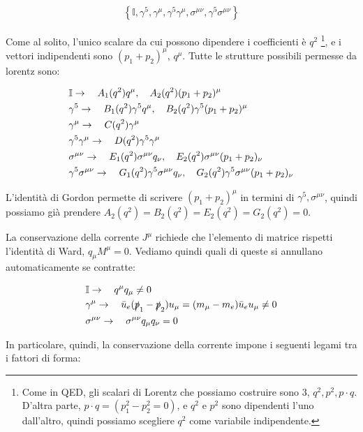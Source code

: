 \documentclass[11pt]{report}
\begin{document}
\begin{align}
    \left\{\mathbb{I}, \gamma^5, \gamma^\mu, \gamma^5\gamma^\mu, \sigma^{\mu\nu}, \gamma^5\sigma^{\mu\nu} \right\}
\end{align}

Come al solito, l'unico scalare da cui possono dipendere i coefficienti è \(q^2\) \footnote{Come in QED, gli scalari di Lorentz che possiamo costruire sono 3, \(q^2, p^2, p\cdot q\). D'altra parte, \(p\cdot q = (p_1^2 - p_2^2 = 0)\), e \(q^2\) e \(p^2\) sono dipendenti l'uno dall'altro, quindi possiamo scegliere \(q^2\) come variabile indipendente.}, e i vettori indipendenti sono \((p_1+p_2)^\mu, \, q^\mu\). Tutte le strutture possibili permesse da lorentz sono: 

\begin{align}
    &\mathbb{I} \to \quad A_1(q^2)q^\mu, \quad A_2(q^2)(p_1+p_2)^\mu \notag \\
    &\gamma^5 \to \quad B_1(q^2)\gamma^5 q^\mu, \quad B_2(q^2)\gamma^5 (p_1+p_2)^\mu \notag \\
    &\gamma^\mu  \to \quad C(q^2)\gamma^\mu \notag \\
    &\gamma^5\gamma^\mu \to \quad D(q^2) \gamma^5\gamma^\mu \notag \\ 
    &\sigma^{\mu\nu} \to \quad E_1(q^2)\sigma^{\mu\nu}q_\nu, \quad E_2(q^2)\sigma^{\mu\nu}(p_1+p_2)_\nu \notag \\
    &\gamma^5\sigma^{\mu\nu} \to \quad G_1(q^2)\gamma^5\sigma^{\mu\nu}q_\nu, \quad G_2(q^2)\gamma^5\sigma^{\mu\nu}(p_1+p_2)_\nu 
\end{align}

L'identità di Gordon permette di scrivere \((p_1+p_2)^\mu\) in termini di \(\gamma^5, \sigma^{\mu\nu}\), quindi possiamo già prendere \(A_2(q^2) = B_2(q^2) = E_2(q^2) = G_2(q^2) = 0\). 


La conservazione della corrente \(J^\mu\) richiede che l'elemento di matrice rispetti l'identità di Ward, \(q_\mu M^\mu = 0\). Vediamo quindi quali di queste si annullano automaticamente se contratte:   

\begin{align}
    &\mathbb{I} \to \quad q^\mu q_\mu \neq 0  \notag \\
    &\gamma^\mu  \to \quad \bar{u}_e(\slashed{p}_1 - \slashed{p}_2) u_\mu = (m_\mu-m_e)\bar{u}_e u_\mu \neq 0 \notag \\
    &\sigma^{\mu\nu} \to \quad \sigma^{\mu\nu}q_\mu q_\nu = 0
\end{align}

In particolare, quindi, la conservazione della corrente impone i seguenti legami tra i fattori di forma: 
\end{document}
